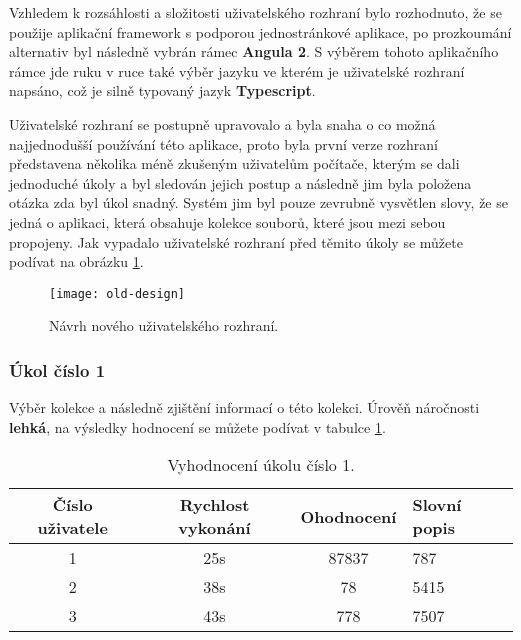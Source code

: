 \par Vzhledem k rozsáhlosti a složitosti uživatelského rozhraní bylo rozhodnuto, že se použije aplikační framework s podporou jednostránkové aplikace, po prozkoumání alternativ byl následně vybrán rámec \textbf{Angula 2}. S výběrem tohoto aplikačního rámce jde ruku v ruce také výběr jazyku ve kterém je uživatelské rozhraní napsáno, což je silně typovaný jazyk \textbf{Typescript}.

\par Uživatelské rozhraní se postupně upravovalo a byla snaha o co možná najjednodušší používání této aplikace, proto byla první verze rozhraní představena několika méně zkušeným uživatelům počítače, kterým se dali jednoduché úkoly a byl sledován jejich postup a následně jim byla položena otázka zda byl úkol snadný. Systém jim byl pouze zevrubně vysvětlen slovy, že se jedná o aplikaci, která obsahuje kolekce souborů, které jsou mezi sebou propojeny. Jak vypadalo uživatelské rozhraní před těmito úkoly se můžete podívat na obrázku \ref{old-ui}.

\begin{figure}[!h]
  \centering
  \texttt{[image: old-design]}
  \caption{Návrh nového uživatelského rozhraní.}
  \label{old-ui}
\end{figure}

\subsubsection{Úkol číslo 1} Výběr kolekce a následně zjištění informací o této kolekci. Úrověň náročnosti \textbf{lehká}, na výsledky hodnocení se můžete podívat v tabulce \ref{ukol-1}.
\begin{table}[htp]
\begin{center}
\begin{tabular}{ || c || c | c |  m{5cm} || } 
 \hline
 Číslo uživatele & Rychlost vykonání & Ohodnocení & Slovní popis \\ [0.5ex] 
 \hline
 \hline
 1 & 25s & 87837 & 787 \\ 
 \hline
 2 & 38s & 78 & 5415 \\
 \hline
 3 & 43s & 778 & 7507 \\
 \hline
\end{tabular}
\end{center}
\caption{Vyhodnocení úkolu číslo 1.}
\label{ukol-1}
\end{table}
